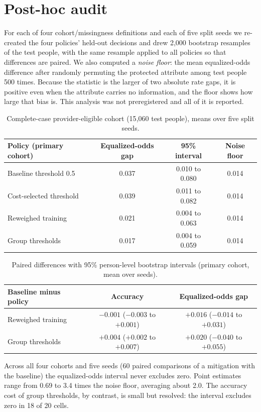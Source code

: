 \documentclass[11pt]{article}
\begin{document}
\section{Post-hoc audit}
For each of four cohort/missingness definitions and each of five split seeds we re-created the four policies' held-out decisions and drew
2{,}000 bootstrap resamples of the test people, with the same resample applied to all policies so that differences are paired. We also
computed a \emph{noise floor}: the mean equalized-odds difference after randomly permuting the protected attribute among test people
500 times. Because the statistic is the larger of two absolute rate gaps, it is positive even when the attribute carries no information,
and the floor shows how large that bias is. This analysis was not preregistered and all of it is reported.
\begin{table}[h]
\centering\small
\begin{tabular}{lccc}
\toprule
Policy (primary cohort) & Equalized-odds gap & 95\% interval & Noise floor\\
\midrule
Baseline threshold 0.5 & 0.037 & 0.010 to 0.080 & 0.014\\
Cost-selected threshold & 0.039 & 0.011 to 0.082 & 0.014\\
Reweighed training & 0.021 & 0.004 to 0.063 & 0.014\\
Group thresholds & 0.017 & 0.004 to 0.059 & 0.014\\
\bottomrule
\end{tabular}
\caption{Complete-case provider-eligible cohort (15{,}060 test people), means over five split seeds.}
\end{table}
\begin{table}[h]
\centering\small
\begin{tabular}{lcc}
\toprule
Baseline minus policy & Accuracy & Equalized-odds gap\\
\midrule
Reweighed training & $-0.001$ ($-0.003$ to $+0.001$) & $+0.016$ ($-0.014$ to $+0.031$)\\
Group thresholds & $+0.004$ ($+0.002$ to $+0.007$) & $+0.020$ ($-0.040$ to $+0.055$)\\
\bottomrule
\end{tabular}
\caption{Paired differences with 95\% person-level bootstrap intervals (primary cohort, mean over seeds).}
\end{table}
Across all four cohorts and five seeds (60 paired comparisons of a mitigation with the baseline) the equalized-odds interval never
excludes zero. Point estimates range from 0.69 to 3.4 times the noise floor, averaging about 2.0. The accuracy cost of group thresholds,
by contrast, is small but resolved: the interval excludes zero in 18 of 20 cells.
\end{document}
